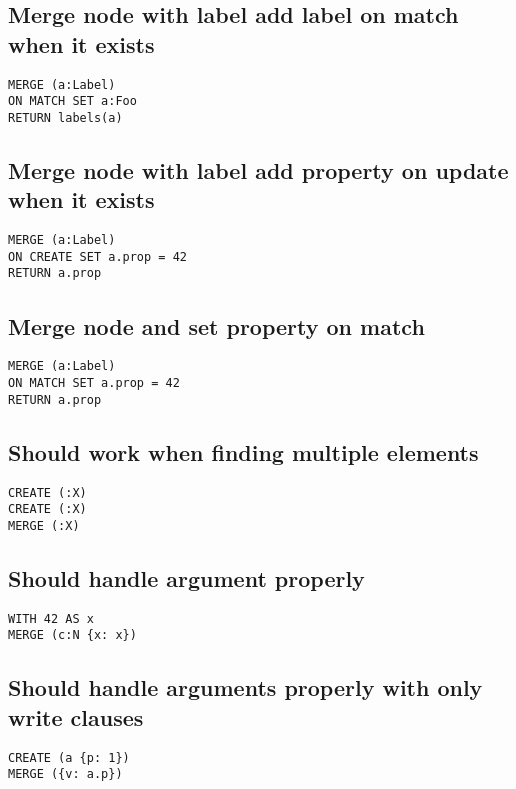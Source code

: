 \subsection{Merge node with label add label on match when it exists}

\begin{lstlisting}
MERGE (a:Label)
ON MATCH SET a:Foo
RETURN labels(a)
\end{lstlisting}

\subsection{Merge node with label add property on update when it exists}

\begin{lstlisting}
MERGE (a:Label)
ON CREATE SET a.prop = 42
RETURN a.prop
\end{lstlisting}

\subsection{Merge node and set property on match}

\begin{lstlisting}
MERGE (a:Label)
ON MATCH SET a.prop = 42
RETURN a.prop
\end{lstlisting}

\subsection{Should work when finding multiple elements}

\begin{lstlisting}
CREATE (:X)
CREATE (:X)
MERGE (:X)
\end{lstlisting}

\subsection{Should handle argument properly}

\begin{lstlisting}
WITH 42 AS x
MERGE (c:N {x: x})
\end{lstlisting}

\subsection{Should handle arguments properly with only write clauses}

\begin{lstlisting}
CREATE (a {p: 1})
MERGE ({v: a.p})
\end{lstlisting}

